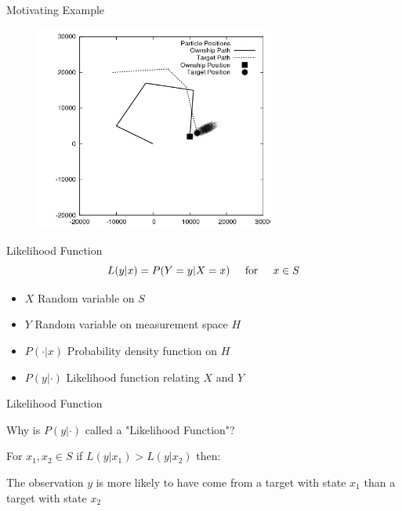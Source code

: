 \documentclass{beamer}
\begin{document}
\begin{frame}{Motivating Example}
\begin{figure}
\centering
\includegraphics[width=0.7\textwidth]{data/azimuth_only_4000.png}
\end{figure}
\end{frame}


\begin{frame}{Likelihood Function}
\begin{equation}
L(y|x) = P( Y=y | X=x ) \hspace{0.5cm} \mbox{for} \hspace{0.5cm} x \in S
\end{equation}

\vspace{1cm}

\begin{itemize}
\item \(X\) Random variable on \(S\)
\item \(Y\) Random variable on measurement space \(H\)
\item \(P(\cdot|x)\) Probability density function on \(H\)
\item \(P(y|\cdot)\) Likelihood function relating \(X\) and \(Y\)
\end{itemize}

\end{frame}



\begin{frame}{Likelihood Function}

Why is \(P(y|\cdot)\) called a "Likelihood Function"?

\vspace{1cm}

For \hspace{0.25cm} \(x_{1}, x_{2} \in S \) \hspace{0.25cm} if \hspace{0.25cm} \(L(y|x_{1})>L(y|x_{2})\) \hspace{0.25cm} then:

\vspace{1cm}

The observation \(y\) is more likely to have come from a target with state \(x_{1}\) than a target with state \(x_{2}\)

\end{frame}
\end{document}
